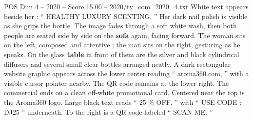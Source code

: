 \begin{textsample}{POS Dim 4 – 2020 – Score 15.00 – 2020/tv\_com\_2020\_4.txt}
White text appears beside her : “ HEALTHY LUXURY SCENTING. ” Her dark nail polish is visible as she grips the bottle.
The image fades through a soft white wash, then both people are seated side by side on the \textbf{sofa} again, facing forward.
The woman sits on the left, composed and attentive ; the man sits on the right, gesturing as he speaks.
On the glass \textbf{table} in front of them are the silver and black cylindrical diffusers and several small clear bottles arranged neatly.
A dark rectangular website graphic appears across the lower center reading “ aroma360.com, ” with a visible cursor pointer nearby.
The QR code remains at the lower right.
The commercial ends on a clean off-white promotional card.
Centered near the top is the Aroma360 logo.
Large black text reads “ 25 \% OFF, ” with “ USE CODE : DJ25 ” underneath.
To the right is a QR code labeled “ SCAN ME. ”

\end{textsample}
